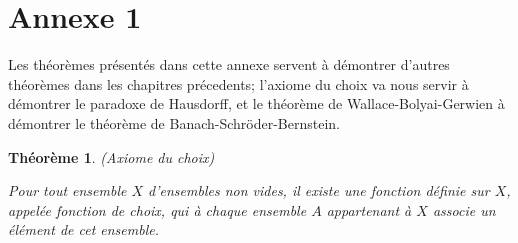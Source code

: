 \chapter*{Annexe 1}
\newtheorem{kkk}{Théorème}
\newtheorem{li}{Lemme}

\makeatletter
\renewcommand{\thesection}{\@arabic\c@section}
\makeatother

\setcounter{section}{0}
Les théorèmes présentés dans cette annexe servent à démontrer d'autres théorèmes dans les chapitres précedents; l'axiome du choix va nous servir à démontrer le paradoxe de Hausdorff, et le théorème de Wallace-Bolyai-Gerwien à démontrer le théorème de Banach-Schröder-Bernstein.
\begin{kkk}(Axiome du choix)\cite{cite5}
  \hfill

\noindent
  Pour tout ensemble $X$ d'ensembles non vides, il existe une fonction définie sur $X$, appelée fonction de choix, qui à chaque ensemble $A$ appartenant à $X$ associe un élément de cet ensemble.
  \label{axiome}
\end{kkk}

